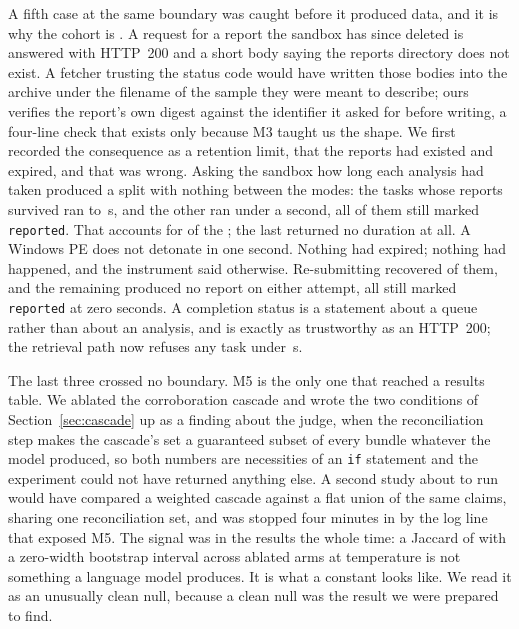 A fifth case at the same boundary was caught before it produced data, and it is why the cohort is
. A request for a report the sandbox has since deleted is answered with HTTP~200
and a short body saying the reports directory does not exist. A fetcher trusting the status code
would have written those bodies into the archive under the filename of the sample they were meant to
describe; ours verifies the report's own digest against the identifier it asked for before writing,
a four-line check that exists only because M3 taught us the shape. We first recorded the consequence
as a retention limit, that the reports had existed and expired, and that was wrong. Asking the
sandbox how long each analysis had taken produced a split with nothing between the modes: the
 tasks whose reports survived ran  to \,s,
and the other  ran under a second, all  of them
still marked \texttt{reported}. That accounts for  of the ; the
last returned no duration at all. A Windows PE does not detonate in one second. Nothing had expired;
nothing had happened, and the instrument said otherwise. Re-submitting recovered
 of them, and the remaining  produced no report on either
attempt, all  still marked \texttt{reported} at zero
seconds. A completion status is a statement about a queue rather than about an analysis, and is
exactly as trustworthy as an HTTP~200; the retrieval path now refuses any task under \,s.

The last three crossed no boundary. M5 is the only one that reached a results table. We ablated the
corroboration cascade and wrote the two conditions of Section~\ref{sec:cascade} up as a finding
about the judge, when the reconciliation step makes the cascade's set a guaranteed subset of every
bundle whatever the model produced, so both numbers are necessities of an \texttt{if} statement and
the experiment could not have returned anything else. A second study about to run would have
compared a weighted cascade against a flat union of the same claims, sharing one reconciliation set,
and was stopped four minutes in by the log line that exposed M5. The signal was in the results the
whole time: a Jaccard of  with a zero-width bootstrap interval across
 ablated arms at temperature  is not something
a language model produces. It is what a constant looks like. We read it as an unusually clean null,
because a clean null was the result we were prepared to find.

